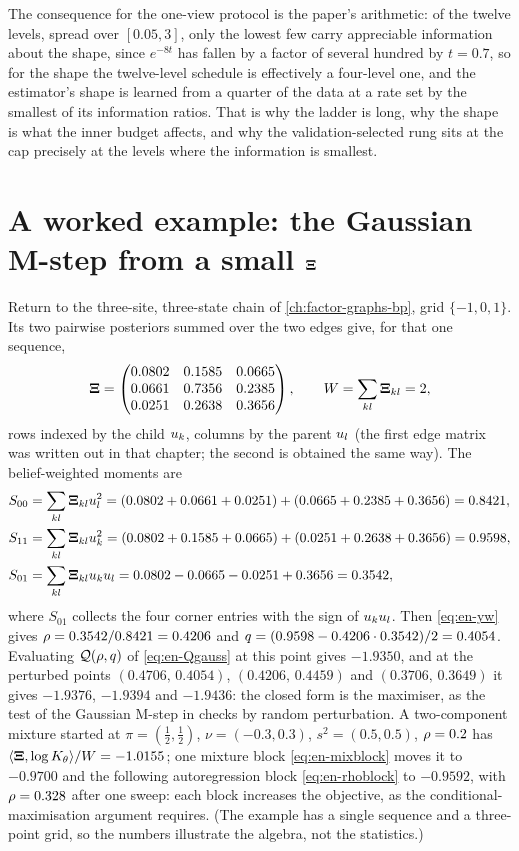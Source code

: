 The consequence for the one-view protocol is the paper's arithmetic: of the twelve
levels, spread over $[0.05,3]$, only the lowest few carry appreciable information about
the shape, since $e^{-8t}$ has fallen by a factor of several hundred by $t=0.7$, so
for the shape the twelve-level schedule is effectively a four-level one, and the
estimator's shape is learned from a quarter of the data at a rate set by the smallest
of its information ratios. That is why the ladder is long, why the shape is what the
inner budget affects, and why the validation-selected rung sits at the cap precisely
at the levels where the information is smallest.

\section{A worked example: the Gaussian M-step from a small $\mathbf{\Xi}$}

Return to the three-site, three-state chain of \cref{ch:factor-graphs-bp}, grid
$\{-1,0,1\}$. Its two pairwise posteriors summed over the two edges give, for that one
sequence,
\[
  \mathbf{\Xi}=\begin{pmatrix}0.0802&0.1585&0.0665\\0.0661&0.7356&0.2385\\0.0251&0.2638&0.3656\end{pmatrix},
  \qquad W=\sum_{kl}\mathbf{\Xi}_{kl}=2,
\]
rows indexed by the child $u_{k}$, columns by the parent $u_{l}$ (the first edge
matrix was written out in that chapter; the second is obtained the same way). The
belief-weighted moments are
\begin{align*}
  S_{00}&=\sum_{kl}\mathbf{\Xi}_{kl}u_{l}^2=(0.0802+0.0661+0.0251)+(0.0665+0.2385+0.3656)=0.8421,\\
  S_{11}&=\sum_{kl}\mathbf{\Xi}_{kl}u_{k}^2=(0.0802+0.1585+0.0665)+(0.0251+0.2638+0.3656)=0.9598,\\
  S_{01}&=\sum_{kl}\mathbf{\Xi}_{kl}u_{k}u_{l}=0.0802-0.0665-0.0251+0.3656=0.3542,
\end{align*}
where $S_{01}$ collects the four corner entries with the sign of $u_{k}u_{l}$. Then
\cref{eq:en-yw} gives $\rho=0.3542/0.8421=0.4206$ and
$q=(0.9598-0.4206\cdot0.3542)/2=0.4054$. Evaluating $\mathcal{Q}(\rho,q)$ of
\cref{eq:en-Qgauss} at this point gives $-1.9350$, and at the perturbed points
$(0.4706,\,0.4054)$, $(0.4206,\,0.4459)$ and $(0.3706,\,0.3649)$ it gives $-1.9376$,
$-1.9394$ and $-1.9436$: the closed form is the maximiser, as the test of the Gaussian
M-step in  checks by random perturbation. A two-component
mixture started at $\pi=(\tfrac12,\tfrac12)$, $\nu=(-0.3,0.3)$, $s^2=(0.5,0.5)$,
$\rho=0.2$ has $\langle\mathbf{\Xi},\log K_{\theta}\rangle/W=-1.0155$; one mixture block
\cref{eq:en-mixblock} moves it to $-0.9700$ and the following autoregression block
\cref{eq:en-rhoblock} to $-0.9592$, with $\rho=0.328$ after one sweep: each block
increases the objective, as the conditional-maximisation argument requires. (The
example has a single sequence and a three-point grid, so the numbers illustrate the
algebra, not the statistics.)

